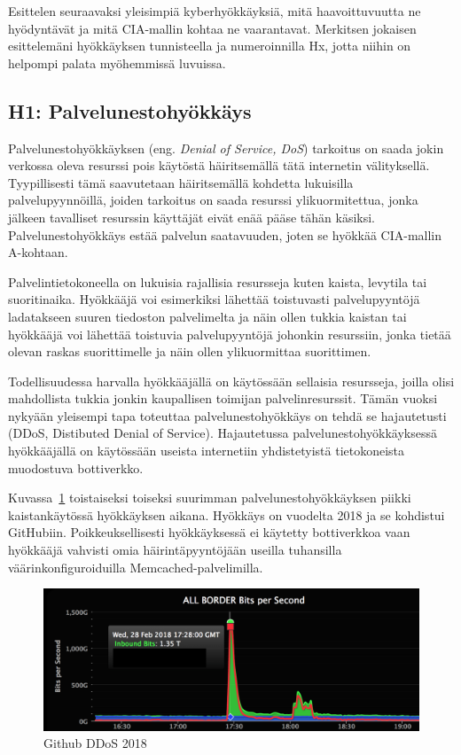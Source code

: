 Esittelen seuraavaksi yleisimpiä kyberhyökkäyksiä, mitä haavoittuvuutta ne hyödyntävät ja mitä CIA-mallin kohtaa ne vaarantavat. Merkitsen jokaisen esittelemäni hyökkäyksen tunnisteella ja numeroinnilla Hx, jotta niihin on helpompi palata myöhemmissä luvuissa.

\subsection{H1: Palvelunestohyökkäys}
Palvelunestohyökkäyksen (eng. \textit{Denial of Service, DoS}) tarkoitus on saada jokin verkossa oleva resurssi pois käytöstä häiritsemällä tätä internetin välityksellä. Tyypillisesti tämä saavutetaan häiritsemällä kohdetta lukuisilla palvelupyynnöillä, joiden tarkoitus on saada resurssi ylikuormitettua, jonka jälkeen tavalliset resurssin käyttäjät eivät enää pääse tähän käsiksi. Palvelunestohyökkäys estää palvelun saatavuuden, joten se hyökkää CIA-mallin A-kohtaan.

Palvelintietokoneella on lukuisia rajallisia resursseja kuten kaista, levytila tai suoritinaika. Hyökkääjä voi esimerkiksi lähettää toistuvasti palvelupyyntöjä ladatakseen suuren tiedoston palvelimelta ja näin ollen tukkia kaistan tai hyökkääjä voi lähettää toistuvia palvelupyyntöjä johonkin resurssiin, jonka tietää olevan raskas suorittimelle ja näin ollen ylikuormittaa suorittimen.

Todellisuudessa harvalla hyökkääjällä on käytössään sellaisia resursseja, joilla olisi mahdollista tukkia jonkin kaupallisen toimijan palvelinresurssit. Tämän vuoksi nykyään yleisempi tapa toteuttaa palvelunestohyökkäys on tehdä se hajautetusti (DDoS, Distibuted Denial of Service). Hajautetussa palvelunestohyökkäyksessä hyökkääjällä on käytössään useista internetiin yhdistetyistä tietokoneista muodostuva bottiverkko.~\cite{nist_ddos}

Kuvassa~\ref{github_ddos} toistaiseksi toiseksi suurimman palvelunestohyökkäyksen piikki kaistankäytössä hyökkäyksen aikana. Hyökkäys on vuodelta 2018 ja se kohdistui GitHubiin. Poikkeuksellisesti hyökkäyksessä ei käytetty bottiverkkoa vaan hyökkääjä vahvisti omia häirintäpyyntöjään useilla tuhansilla väärinkonfiguroiduilla Memcached-palvelimilla.~\cite{github_ddos}

\begin{figure}
\centering \includegraphics[width=1\textwidth]{kuvat/github_ddos.png}
\caption{Github DDoS 2018~\cite{github_ddos}}
\label{github_ddos} 
\end{figure}

